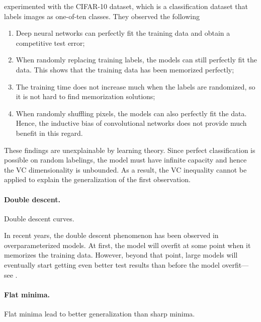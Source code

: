 \citet{zhang2021understanding} experimented with the CIFAR-10 dataset, which is a classification
dataset that labels images as one-of-ten classes. They observed the following
\begin{enumerate}
    \item Deep neural networks can perfectly fit the training data and obtain a competitive test error;
    \item When randomly replacing training labels, the models can still perfectly fit the data. This shows
          that the training data has been memorized perfectly;
    \item The training time does not increase much when the labels are randomized, so it is not hard to find
          memorization solutions;
    \item When randomly shuffling pixels, the models can also perfectly fit the data. Hence, the inductive
          bias of convolutional networks does not provide much benefit in this regard.
\end{enumerate}
These findings are unexplainable by learning theory. Since perfect classification is possible on
random labelings, the model must have infinite capacity and hence the VC dimensionality is unbounded.
As a result, the VC inequality cannot be applied to explain the generalization of the first
observation.

\paragraph{Double descent.}

\begin{marginfigure}
    \centering
    \caption{Double descent curves.}
    \label{fig:double-descent}
\end{marginfigure}

In recent years, the double descent phenomenon has been observed in overparameterized models. At
first, the model will overfit at some point when it memorizes the training data. However, beyond
that point, large models will eventually start getting even better test results than before the
model overfit---see .

\paragraph{Flat minima.}

\begin{marginfigure}
    \centering
    \caption{Flat minima lead to better generalization than sharp minima.}
    \label{fig:flat-minima}
\end{marginfigure}

